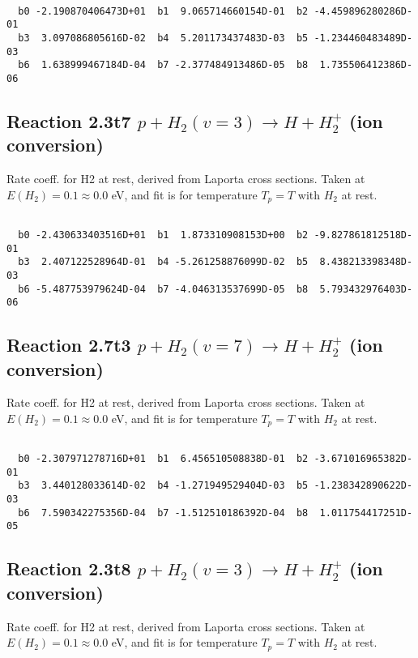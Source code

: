 \begin{small}\begin{verbatim}

  b0 -2.190870406473D+01  b1  9.065714660154D-01  b2 -4.459896280286D-01
  b3  3.097086805616D-02  b4  5.201173437483D-03  b5 -1.234460483489D-03
  b6  1.638999467184D-04  b7 -2.377484913486D-05  b8  1.735506412386D-06

\end{verbatim}\end{small}

\newpage
\subsection{
Reaction 2.3t7
$ p + H_2(v=3) \rightarrow H + H_2^+$ (ion conversion)
}
Rate coeff. for H2 at rest, derived from Laporta cross sections.
Taken at $E(H_2) = 0.1 \approx 0.0$ eV,  and fit is for temperature $T_p=T$ with $H_2$ at rest.

\begin{small}\begin{verbatim}

  b0 -2.430633403516D+01  b1  1.873310908153D+00  b2 -9.827861812518D-01
  b3  2.407122528964D-01  b4 -5.261258876099D-02  b5  8.438213398348D-03
  b6 -5.487753979624D-04  b7 -4.046313537699D-05  b8  5.793432976403D-06

\end{verbatim}\end{small}

\newpage
\subsection{
Reaction 2.7t3
$ p + H_2(v=7) \rightarrow H + H_2^+$ (ion conversion)
}
Rate coeff. for H2 at rest, derived from Laporta cross sections.
Taken at $E(H_2) = 0.1 \approx 0.0$ eV,  and fit is for temperature $T_p=T$ with $H_2$ at rest.

\begin{small}\begin{verbatim}

  b0 -2.307971278716D+01  b1  6.456510508838D-01  b2 -3.671016965382D-01
  b3  3.440128033614D-02  b4 -1.271949529404D-03  b5 -1.238342890622D-03
  b6  7.590342275356D-04  b7 -1.512510186392D-04  b8  1.011754417251D-05

\end{verbatim}\end{small}

\newpage
\subsection{
Reaction 2.3t8
$ p + H_2(v=3) \rightarrow H + H_2^+$ (ion conversion)
}
Rate coeff. for H2 at rest, derived from Laporta cross sections.
Taken at $E(H_2) = 0.1 \approx 0.0$ eV,  and fit is for temperature $T_p=T$ with $H_2$ at rest.

